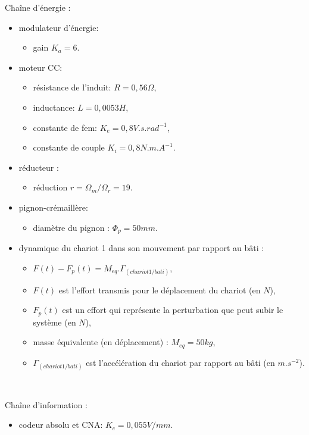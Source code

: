 Chaîne d'énergie :
\begin{itemize}
 \item modulateur d'énergie:
 \begin{itemize}
  \item gain $K_a=6$.
 \end{itemize}
 \item moteur CC:
  \begin{itemize}
  \item résistance de l'induit: $R=0,56\Omega$,
  \item inductance: $L=0,0053 H$,
  \item constante de fem: $K_e=0,8V.s.rad^{-1}$,
  \item constante de couple $K_i=0,8N.m.A^{-1}$.
 \end{itemize}
 \item réducteur :
  \begin{itemize}
  \item réduction $r=\Omega_m/\Omega_r=19$.
  \end{itemize}
 \item pignon-crémaillère:
  \begin{itemize}
  \item diamètre du pignon : $\Phi_p=50mm$.
  \end{itemize}
 \item dynamique du chariot 1 dans son mouvement par rapport au bâti :
  \begin{itemize}
  \item $F(t)-F_p(t)=M_{eq}.\Gamma_{(chariot 1/bati)}$,
  \item $F(t)$ est l'effort transmis pour le déplacement du chariot (en $N$),
  \item $F_p(t)$ est un effort qui représente la perturbation que peut subir le système (en $N$),
  \item masse équivalente (en déplacement) : $M_{eq}=50kg$,
  \item $\Gamma_{(chariot 1/bati)}$ est l'accélération du chariot par rapport au bâti (en $m.s^{-2}$).
  \end{itemize}
\end{itemize}

~\

Chaîne d'information :
\begin{itemize}
 \item codeur absolu et CNA: $K_c=0,055V/mm$.
\end{itemize}

~\

